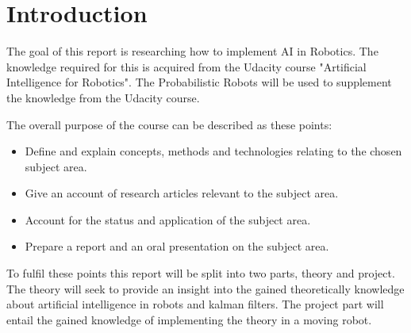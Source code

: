 \chapter{Introduction}
The goal of this report is researching how to implement AI in Robotics. The knowledge required for this is acquired from the Udacity course "Artificial Intelligence for Robotics"\cite{AIROK}. The Probabilistic Robots will be used to supplement the knowledge from the Udacity course\cite{thrun2005probabilistic}.

The overall purpose of the course can be described as these points:
\begin{itemize}
\item Define and explain concepts, methods and technologies relating to the chosen subject area.
\item Give an account of research articles relevant to the subject area.
\item Account for the status and application of the subject area.
\item Prepare a report and an oral presentation on the subject area.
\end{itemize}

To fulfil these points this report will be split into two parts, theory and project. The theory will seek to provide an insight into the gained theoretically knowledge about artificial intelligence in robots and kalman filters.
The project part will entail the gained knowledge of implementing the theory in a moving robot.
